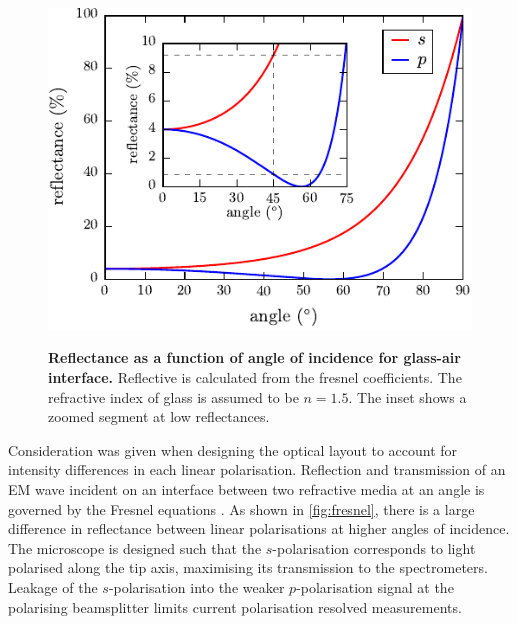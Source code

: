 \documentclass[12pt, a4paper, oneside]{book}
\begin{document}
\begin{figure}
\vspace{-10pt}
\centering
{\includegraphics{figures/fresnel_coefficients}}
{\caption[Reflectance as a function of angle of incidence for glass-air interface]{\textbf{Reflectance as a function of angle of incidence for glass-air interface.} Reflective is calculated from the fresnel coefficients. The refractive index of glass is assumed to be $n=1.5$. The inset shows a zoomed segment at low reflectances.}
\label{fig:fresnel}}
\vspace{-5pt}
\end{figure}

Consideration was given when designing the optical layout to account for intensity differences in each linear polarisation. Reflection and transmission of an EM wave incident on an interface between two refractive media at an angle is governed by the Fresnel equations \cite{grant2013electromagnetism}. As shown in \autoref{fig:fresnel}, there is a large difference in reflectance between linear polarisations at higher angles of incidence. The microscope is designed such that the $s$-polarisation corresponds to light polarised along the tip axis, maximising its transmission to the spectrometers. Leakage of the $s$-polarisation into the weaker $p$-polarisation signal at the polarising beamsplitter limits current polarisation resolved measurements.

\end{document}
